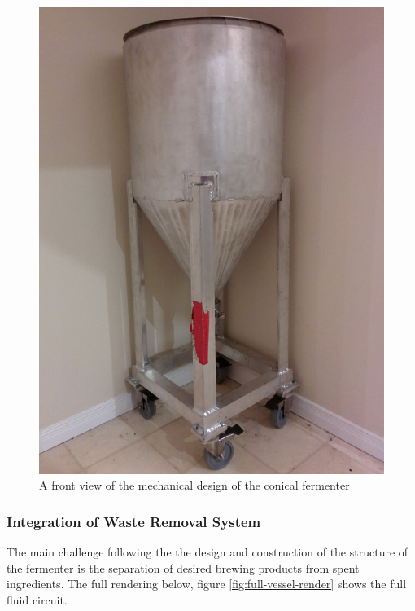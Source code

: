\documentclass{article}
\begin{document}
\begin{figure}[H]
\begin{center}
\includegraphics[scale=0.10]{mechanical-prototype.jpg}
\caption{A front view of the mechanical design of the conical fermenter}
\label{fig:mechanical-prototype}
\end{center}
\end{figure}

\subsubsection{Integration of Waste Removal System}
The main challenge following the the design and construction of the structure of the fermenter is the separation of desired brewing products from spent ingredients.  The full rendering below, figure \ref{fig:full-vessel-render} shows the full fluid circuit.
\end{document}
